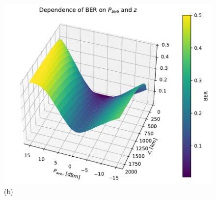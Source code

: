 \begin{figure}[htpb]
\begin{minipage}[h]{0.48\linewidth}
{        \includegraphics[width=1\linewidth]{images/benchmark/ber_vs_p_ave_dbm_3d_1ch_256qam.pdf} (b) 
    }
    \end{minipage}


\end{figure}

